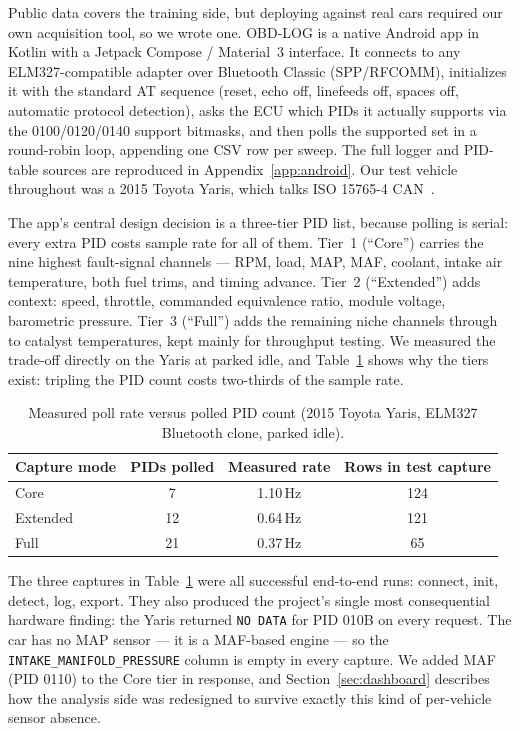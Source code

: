 Public data covers the training side, but deploying against real cars
required our own acquisition tool, so we wrote one. OBD-LOG is a native
Android app in Kotlin with a Jetpack Compose / Material~3 interface. It
connects to any ELM327-compatible adapter over Bluetooth Classic
(SPP/RFCOMM), initializes it with the standard AT sequence (reset, echo off,
linefeeds off, spaces off, automatic protocol detection), asks the ECU which
PIDs it actually supports via the 0100/0120/0140 support bitmasks, and then
polls the supported set in a round-robin loop, appending one CSV row per
sweep. The full logger and PID-table sources are reproduced in
Appendix~\ref{app:android}. Our test vehicle throughout was a 2015 Toyota
Yaris, which talks ISO 15765-4 CAN~\cite{iso15765}.

The app's central design decision is a three-tier PID list, because polling
is serial: every extra PID costs sample rate for all of them. Tier~1
(``Core'') carries the nine highest fault-signal channels --- RPM, load,
MAP, MAF, coolant, intake air temperature, both fuel trims, and timing
advance. Tier~2 (``Extended'') adds context: speed, throttle, commanded
equivalence ratio, module voltage, barometric pressure. Tier~3 (``Full'')
adds the remaining niche channels through to catalyst temperatures, kept
mainly for throughput testing. We measured the trade-off directly on the
Yaris at parked idle, and Table~\ref{tab:pollrate} shows why the tiers
exist: tripling the PID count costs two-thirds of the sample rate.

\begin{table}[H]
  \centering
  \caption{Measured poll rate versus polled PID count (2015 Toyota Yaris,
    ELM327 Bluetooth clone, parked idle).}
  \label{tab:pollrate}
  \begin{tabular}{lccc}
    \toprule
    Capture mode & PIDs polled & Measured rate & Rows in test capture\\
    \midrule
    Core     & 7  & 1.10\,Hz & 124\\
    Extended & 12 & 0.64\,Hz & 121\\
    Full     & 21 & 0.37\,Hz & 65\\
    \bottomrule
  \end{tabular}
\end{table}

The three captures in Table~\ref{tab:pollrate} were all successful
end-to-end runs: connect, init, detect, log, export. They also produced the
project's single most consequential hardware finding: the Yaris returned
\texttt{NO DATA} for PID 010B on every request. The car has no MAP sensor
--- it is a MAF-based engine --- so the \texttt{INTAKE\_MANIFOLD\_PRESSURE}
column is empty in every capture. We added MAF (PID 0110) to the Core tier
in response, and Section~\ref{sec:dashboard} describes how the analysis side
was redesigned to survive exactly this kind of per-vehicle sensor absence.


